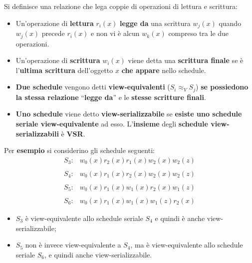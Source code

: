 \documentclass[a4paper]{article}
\newcommand{\dquotes}[1]{``#1''}
\begin{document}
	Si definisce una relazione che lega coppie di operazioni di lettura e scrittura:
	\begin{itemize}
		\item Un'operazione di \textbf{lettura} $r_{i}\left(x\right)$ \textcolor{Red3}{\textbf{legge da}} una scrittura $w_{j}\left(x\right)$ quando $w_{j}\left(x\right)$ precede $r_{i}\left(x\right)$ e non vi è alcun $w_{k}\left(x\right)$ compreso tra le due operazioni.
		
		\item Un'operazione di \textbf{scrittura} $w_{i}\left(x\right)$ viene detta una \textcolor{Red3}{\textbf{scrittura finale}} se è l'\textbf{ultima scrittura} dell'oggetto $x$ \textbf{che appare} nello schedule.
		
		\item \textbf{Due schedule} vengono detti \textcolor{Red3}{\textbf{view-equivalenti}} ($S_{i} \approx_{V} S_{j}$) \textbf{se possiedono la stessa relazione} \dquotes{\textbf{legge da}} e le \textbf{stesse scritture finali}.
		
		\item \textbf{Uno schedule} viene detto \textcolor{Red3}{\textbf{view-serializzabile}} se \textbf{esiste uno schedule seriale view-equivalente} ad esso. L'\textbf{insieme} degli \textbf{schedule view-serializzabili} è \textcolor{Red3}{\textbf{VSR}}.
	\end{itemize}
	Per \textcolor{Green4}{\textbf{esempio}} si considerino gli schedule seguenti:
	\begin{equation*}
		\begin{array}{ll}
			S_{3}: & w_{0}\left(x\right) r_{2}\left(x\right) r_{1}\left(x\right) w_{2}\left(x\right) w_{2}\left(z\right) \\
			\\
			S_{4}: & w_{0}\left(x\right) r_{1}\left(x\right) r_{2}\left(x\right) w_{2}\left(x\right) w_{2}\left(z\right) \\
			\\
			S_{5}: & w_{0}\left(x\right) r_{1}\left(x\right) w_{1}\left(x\right) r_{2}\left(x\right) w_{1}\left(z\right) \\
			\\
			S_{6}: & w_{0}\left(x\right) r_{1}\left(x\right) w_{1}\left(x\right) w_{1}\left(z\right) r_{2}\left(x\right)
		\end{array}
	\end{equation*}
	\begin{itemize}[label=-]
		\item $S_{3}$ è view-equivalente allo schedule seriale $S_{4}$ e quindi è anche view-serializzabile;
		\item $S_{5}$ non è invece view-equivalente a $S_{4}$, ma è view-equivalente allo schedule seriale $S_{6}$, e quindi anche view-serializzabile.
	\end{itemize}
\end{document}
